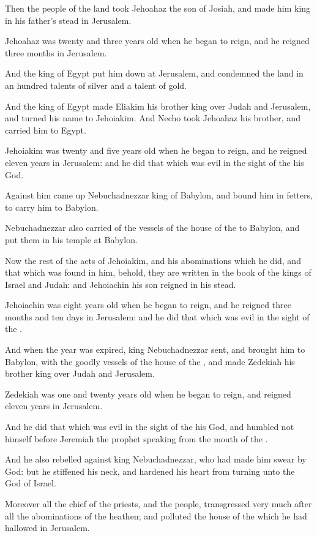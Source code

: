 \Chapter
\Verse Then the people of the land took Jehoahaz the son of Josiah, and made him king in his father's stead in Jerusalem.

\Verse Jehoahaz was twenty and three years old when he began to reign, and he reigned three months in Jerusalem.

\Verse And the king of Egypt put him down at Jerusalem, and condemned the land in an hundred talents of silver and a talent of gold.

\Verse And the king of Egypt made Eliakim his brother king over Judah and Jerusalem, and turned his name to Jehoiakim. And Necho took Jehoahaz his brother, and carried him to Egypt.

\Verse Jehoiakim was twenty and five years old when he began to reign, and he reigned eleven years in Jerusalem: and he did that which was evil in the sight of the \LORD his God.

\Verse Against him came up Nebuchadnezzar king of Babylon, and bound him in fetters, to carry him to Babylon.

\Verse Nebuchadnezzar also carried of the vessels of the house of the \LORD to Babylon, and put them in his temple at Babylon.

\Verse Now the rest of the acts of Jehoiakim, and his abominations which he did, and that which was found in him, behold, they are written in the book of the kings of Israel and Judah: and Jehoiachin his son reigned in his stead.

\Verse Jehoiachin was eight years old when he began to reign, and he reigned three months and ten days in Jerusalem: and he did that which was evil in the sight of the \LORD.

\Verse And when the year was expired, king Nebuchadnezzar sent, and brought him to Babylon, with the goodly vessels of the house of the \LORD, and made Zedekiah his brother king over Judah and Jerusalem.

\Verse Zedekiah was one and twenty years old when he began to reign, and reigned eleven years in Jerusalem.

\Verse And he did that which was evil in the sight of the \LORD his God, and humbled not himself before Jeremiah the prophet speaking from the mouth of the \LORD.

\Verse And he also rebelled against king Nebuchadnezzar, who had made him swear by God: but he stiffened his neck, and hardened his heart from turning unto the \LORD God of Israel.

\Verse Moreover all the chief of the priests, and the people, transgressed very much after all the abominations of the heathen; and polluted the house of the \LORD which he had hallowed in Jerusalem.

